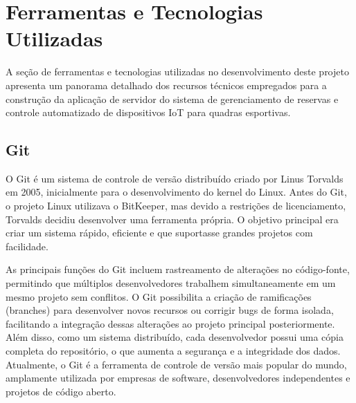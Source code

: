 \section{Ferramentas e Tecnologias Utilizadas}\label{sec:ferramentas_tecnologias}

A seção de ferramentas e tecnologias utilizadas no desenvolvimento deste projeto apresenta um panorama detalhado dos recursos técnicos empregados para a construção da aplicação de servidor do sistema de gerenciamento de reservas e controle automatizado de dispositivos IoT para quadras esportivas. 

\subsection{Git}

O Git é um sistema de controle de versão distribuído criado por Linus Torvalds em 2005, inicialmente para o desenvolvimento do kernel do Linux. Antes do Git, o projeto Linux utilizava o BitKeeper, mas devido a restrições de licenciamento, Torvalds decidiu desenvolver uma ferramenta própria. O objetivo principal era criar um sistema rápido, eficiente e que suportasse grandes projetos com facilidade.

As principais funções do Git incluem rastreamento de alterações no código-fonte, permitindo que múltiplos desenvolvedores trabalhem simultaneamente em um mesmo projeto sem conflitos. O Git possibilita a criação de ramificações (branches) para desenvolver novos recursos ou corrigir bugs de forma isolada, facilitando a integração dessas alterações ao projeto principal posteriormente. Além disso, como um sistema distribuído, cada desenvolvedor possui uma cópia completa do repositório, o que aumenta a segurança e a integridade dos dados. Atualmente, o Git é a ferramenta de controle de versão mais popular do mundo, amplamente utilizada por empresas de software, desenvolvedores independentes e projetos de código aberto.

